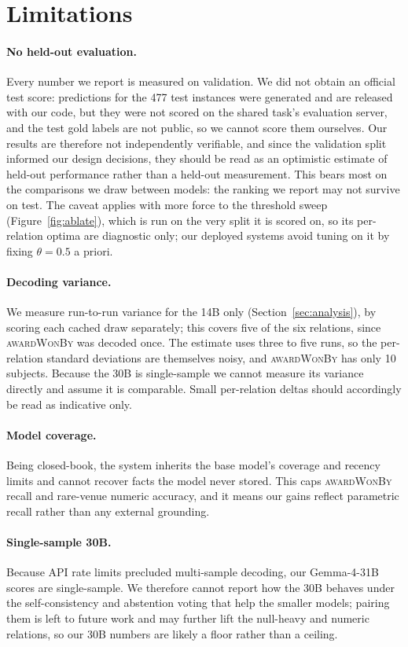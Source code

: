 \section*{Limitations}
\paragraph{No held-out evaluation.}
Every number we report is measured on validation. We did not obtain an official
test score: predictions for the 477 test instances were generated and are released
with our code, but they were not scored on the shared task's evaluation server, and
the test gold labels are not public, so we cannot score them ourselves. Our results
are therefore not independently verifiable, and since the validation split informed
our design decisions, they should be read as an optimistic estimate of held-out
performance rather than a held-out measurement. This bears most on the comparisons
we draw between models: the ranking we report may not survive on test. The caveat
applies with more force to the threshold sweep (Figure~\ref{fig:ablate}), which is
run on the very split it is scored on, so its per-relation optima are diagnostic
only; our deployed systems avoid tuning on it by fixing $\theta{=}0.5$ a priori.

\paragraph{Decoding variance.}
We measure run-to-run variance for the 14B only (Section~\ref{sec:analysis}), by
scoring each cached draw separately; this covers five of the six relations, since
\textsc{awardWonBy} was decoded once. The estimate uses three to five runs, so the
per-relation standard deviations are themselves noisy, and \textsc{awardWonBy} has
only 10 subjects. Because the 30B is single-sample we cannot measure its variance
directly and assume it is comparable. Small per-relation deltas should accordingly
be read as indicative only.

\paragraph{Model coverage.}
Being closed-book, the system inherits the base model's coverage and recency
limits and cannot recover facts the model never stored. This caps
\textsc{awardWonBy} recall and rare-venue numeric accuracy, and it means our gains
reflect parametric recall rather than any external grounding.

\paragraph{Single-sample 30B.}
Because API rate limits precluded multi-sample decoding, our Gemma-4-31B scores are
single-sample. We therefore cannot report how the 30B behaves under the
self-consistency and abstention voting that help the smaller models; pairing them
is left to future work and may further lift the null-heavy and numeric relations,
so our 30B numbers are likely a floor rather than a ceiling.

